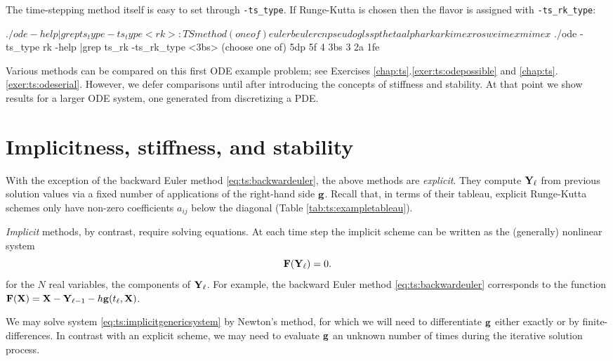 The time-stepping method itself is easy to set through \texttt{-ts\_type}.  If Runge-Kutta is chosen then the flavor is assigned with \texttt{-ts\_rk\_type}:
\begin{cline}
$ ./ode -help |grep ts_type
  -ts_type <rk>: TS method (one of) euler beuler cn pseudo gl ssp theta alpha rk
                 arkimex rosw eimex mimex
$ ./ode -ts_type rk -help |grep ts_rk
  -ts_rk_type <3bs> (choose one of) 5dp 5f 4 3bs 3 2a 1fe
\end{cline}

Various \pTS methods can be compared on this first ODE example problem; see Exercises \ref{chap:ts}.\ref{exer:ts:odepossible} and \ref{chap:ts}.\ref{exer:ts:odeserial}.  However, we defer comparisons until after introducing the concepts of stiffness and stability.  At that point we show results for a larger ODE system, one generated from discretizing a PDE.


\section{Implicitness, stiffness, and stability}

With the exception of the backward Euler method \eqref{eq:ts:backwardeuler}, the above methods are \emph{explicit}.  They compute $\mathbf{Y}_\ell$ from previous solution values via a fixed number of applications of the right-hand side $\mathbf{g}$.  Recall that, in terms of their tableau, explicit Runge-Kutta schemes only have non-zero coefficients $a_{ij}$ below the diagonal (Table \ref{tab:ts:exampletableau}).

\emph{Implicit} methods, by contrast, require solving equations.  At each time step the implicit scheme can be written as the (generally) nonlinear system
\begin{equation}
    \mathbf{F}(\mathbf{Y}_\ell)=0.  \label{eq:ts:implicitgenericsystem}
\end{equation}
for the $N$ real variables, the components of $\mathbf{Y}_\ell$.  For example, the backward Euler method \eqref{eq:ts:backwardeuler} corresponds to the function $\mathbf{F}(\mathbf{X}) = \mathbf{X} - \mathbf{Y}_{\ell-1} - h \mathbf{g}(t_\ell,\mathbf{X})$.

We may solve system \eqref{eq:ts:implicitgenericsystem} by Newton's method, for which we will need to differentiate $\mathbf{g}$ either exactly or by finite-differences.  In contrast with an explicit scheme, we may need to evaluate $\mathbf{g}$ an unknown number of times during the iterative solution process.

